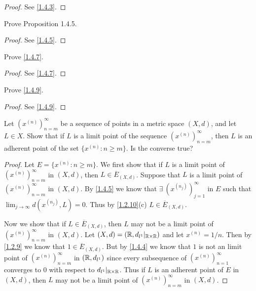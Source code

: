 \begin{proof}
  See \cref{1.4.3}.
\end{proof}

\begin{ex}\label{ex:1.4.2}
  Prove Proposition 1.4.5.
\end{ex}

\begin{proof}
  See \cref{1.4.5}.
\end{proof}

\begin{ex}\label{ex:1.4.3}
  Prove \cref{1.4.7}.
\end{ex}

\begin{proof}
  See \cref{1.4.7}.
\end{proof}

\begin{ex}\label{ex:1.4.4}
  Prove \cref{1.4.9}.
\end{ex}

\begin{proof}
  See \cref{1.4.9}.
\end{proof}

\begin{ex}\label{ex:1.4.5}
  Let \((x^{(n)})_{n = m}^\infty\) be a sequence of points in a metric space \((X, d)\), and let \(L \in X\).
  Show that if \(L\) is a limit point of the sequence \((x^{(n)})_{n = m}^\infty\), then \(L\) is an adherent point of the set \(\{x^{(n)} : n \geq m\}\).
  Is the converse true?
\end{ex}

\begin{proof}
  Let \(E = \{x^{(n)} : n \geq m\}\).
  We first show that if \(L\) is a limit point of \((x^{(n)})_{n = m}^\infty\) in \((X, d)\), then \(L \in \overline{E}_{(X, d)}\).
  Suppose that \(L\) is a limit point of \((x^{(n)})_{n = m}^\infty\) in \((X, d)\).
  By \cref{1.4.5} we know that \(\exists\ (x^{(n_j)})_{j = 1}^\infty\) in \(E\) such that \(\lim_{j \to \infty} d(x^{(n_j)}, L) = 0\).
  Thus by \cref{1.2.10}(c) \(L \in \overline{E}_{(X, d)}\).

  Now we show that if \(L \in \overline{E}_{(X, d)}\), then \(L\) may not be a limit point of \((x^{(n)})_{n = m}^\infty\) in \((X, d)\).
  Let \((X, d) = (\mathbb{R}, d_{l^1}|_{\mathbb{R} \times \mathbb{R}})\) and let \(x^{(n)} = 1 / n\).
  Then by \cref{1.2.9} we know that \(1 \in \overline{E}_{(X, d)}\).
  But by \cref{1.4.4} we know that \(1\) is not an limit point of \((x^{(n)})_{n = m}^\infty\) in \((\mathbb{R}, d_{l^1})\) since every subsequence of \((x^{(n)})_{n = 1}^\infty\) converges to \(0\) with respect to \(d_{l^1}|_{\mathbb{R} \times \mathbb{R}}\).
  Thus if \(L\) is an adherent point of \(E\) in \((X, d)\), then \(L\) may not be a limit point of \((x^{(n)})_{n = m}^\infty\) in \((X, d)\).
\end{proof}

